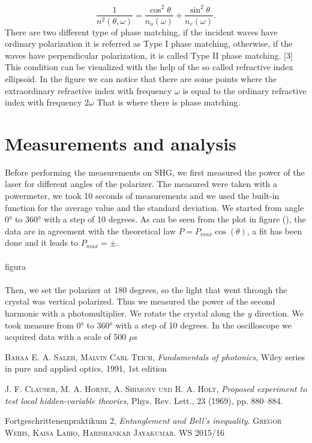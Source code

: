 \documentclass[a4paper,10pt]{article}
\begin{document}
\[\frac{1}{n^2(\theta,\omega)} = \frac{\cos^2\theta}{n_o(\omega)}+\frac{\sin^2\theta}{n_e(\omega)}.\]
There are two different type of phase matching, if the incident waves have ordinary polarization it is referred as Type I phase matching, otherwise, if the waves have perpendicular polarization, it is called Type II phase matching.
[3]
This condition can be visualized with the help of the so called refractive index ellipsoid. In the figure we can notice that there are some points where the extraordinary refractive index with frequency $\omega$ is equal to the ordinary refractive index with frequency $2\omega$ That is where there is phase matching.

\section{Measurements and analysis}
Before performing the measurements on SHG, we first measured the power of the laser for different angles of the polarizer. The measured were taken with a powermeter, we took 10 seconds of measurements and we used the built-in function for the average value and the standard deviation. We started from angle 0° to 360° with a step of 10 degrees. As can be seen from the plot in figure (), the data are in agreement with the theoretical law $P = P_{max}\cos(\theta)$, a fit has been done and it leads to $P_{max} = \pm$.
\\ \\
figura
\\ \\

Then, we set the polarizer at 180 degrees, so the light that went through the crystal was vertical polarized. Thus we measured the power of the second harmonic with a photomultiplier. We rotate the crystal along the $y$ direction. We took measure from 0° to 360° with a step of 10 degrees. In the oscilloscope we acquired data with a scale of 500 $\mu$s


 \begin{thebibliography}{99}

  \textsc{Bahaa E. A. Saleh, Malvin Carl Teich}, \textit{Fundamentals of photonics}, Wiley series in pure and applied optics, 1991, 1st edition

   \textsc{J. F. Clauser, M. A. Horne, A. Shimony und R. A. Holt}, \textit{Proposed experiment to
test local hidden-variable theories}, Phys. Rev. Lett., 23 (1969), pp. 880–884.

Fortgeschrittenenpraktikum 2, \textit{Entanglement and Bell’s inequality}. \textsc{Gregor Weihs, Kaisa Laiho, Harishankar Jayakumar}. WS 2015/16
\end{thebibliography}
\end{document}
